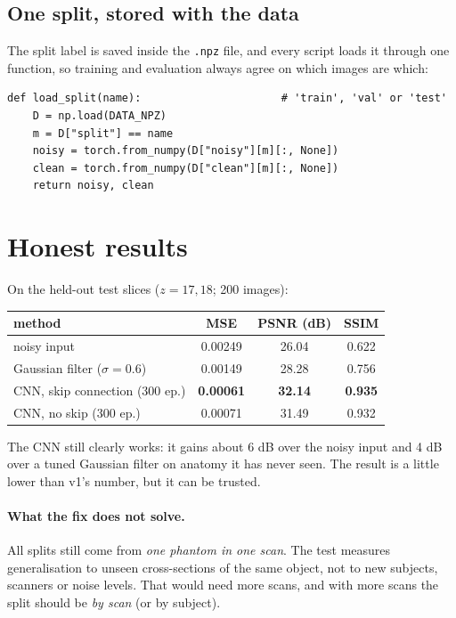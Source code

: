 \documentclass[11pt,a4paper]{article}
\begin{document}
\subsection{One split, stored with the data}

The split label is saved inside the \texttt{.npz} file, and every script loads it through one function, so
training and evaluation always agree on which images are which:

\begin{lstlisting}
def load_split(name):                      # 'train', 'val' or 'test'
    D = np.load(DATA_NPZ)
    m = D["split"] == name
    noisy = torch.from_numpy(D["noisy"][m][:, None])
    clean = torch.from_numpy(D["clean"][m][:, None])
    return noisy, clean
\end{lstlisting}

\section{Honest results}

On the held-out test slices ($z=17,18$; 200 images):

\begin{center}
\begin{tabular}{lccc}
  \toprule
  method & MSE & PSNR (dB) & SSIM \\
  \midrule
  noisy input            & 0.00249 & 26.04 & 0.622 \\
  Gaussian filter ($\sigma=0.6$) & 0.00149 & 28.28 & 0.756 \\
  CNN, skip connection (300 ep.) & \textbf{0.00061} & \textbf{32.14} & \textbf{0.935} \\
  CNN, no skip (300 ep.) & 0.00071 & 31.49 & 0.932 \\
  \bottomrule
\end{tabular}
\end{center}

The CNN still clearly works: it gains about 6 dB over the noisy input and 4 dB over a tuned Gaussian filter on
anatomy it has never seen. The result is a little lower than v1's number, but it can be trusted.

\paragraph{What the fix does not solve.}
All splits still come from \emph{one phantom in one scan}. The test measures generalisation to unseen
cross-sections of the same object, not to new subjects, scanners or noise levels. That would need more scans,
and with more scans the split should be \emph{by scan} (or by subject).
\end{document}
